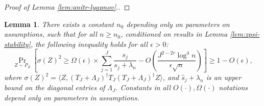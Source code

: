 \documentclass[aos]{imsart}
\renewcommand{\hat}{\widehat}
\newcommand{\ud}{\mathrm d}
\theoremstyle{plain}
\newtheorem{lemma}{Lemma}[section]
\theoremstyle{definition}
\theoremstyle{definition}
\begin{document}
\begin{appendix}
\begin{proof}[Proof of Lemma \ref{lem:anitr-lyapnov}.]
\end{proof}

{\color{orange}
\begin{lemma}
There exists a constant $n_0$ depending only on parameters on assumptions, such that for all $n\geq n_0$,
conditioned on results in Lemma \ref{lem:zpsi-stability}, the following inequality holds for all $\epsilon>0$:
$$
\Pr_{Z\sim P_Z}\left[\sigma(Z)^2 \geq \Omega(\epsilon)\times \sum_{j=1}^J \frac{s_j}{s_j+\lambda_n} - O\left(\frac{J^{2-2r}\log^4 n}{\epsilon \sqrt{n}}\right)\right]\geq 1-O(\epsilon),
$$
where $\sigma(Z)^2 = \langle Z, (T_J+\Lambda_J)^\dagger T_J(T_J+\Lambda_J)^\dagger Z\rangle$, and $\hat s_j+\lambda_n$ is an upper bound on the diagonal entries of $\Lambda_J$.
Constants in all $O(\cdot),\Omega(\cdot)$ notations depend only on parameters in assumptions.
\label{lem:variance-stability}
\end{lemma}
}


\end{appendix}
\end{document}
